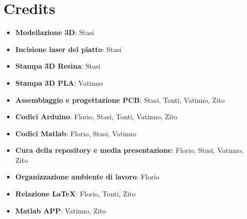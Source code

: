 \section{Credits}

\begin{itemize}
\item \textbf{Modellazione 3D}: Stasi
\item \textbf{Incisione laser del piatto}: Stasi
\item \textbf{Stampa 3D Resina}: Stasi
\item \textbf{Stampa 3D PLA}: Vatinno
\item \textbf{Assemblaggio e progettazione PCB}: Stasi, Tonti, Vatinno, Zito
\item \textbf{Codici Arduino}: Florio, Stasi, Tonti, Vatinno, Zito
\item \textbf{Codici Matlab}: Florio, Stasi, Vatinno
\item \textbf{Cura della repository e media presentazione}: Florio, Stasi, Vatinno, Zito
\item \textbf{Organizzazione ambiente di lavoro}: Florio
\item \textbf{Relazione LaTeX}: Florio, Tonti, Zito
\item \textbf{Matlab APP}: Vatinno, Zito
\end{itemize}